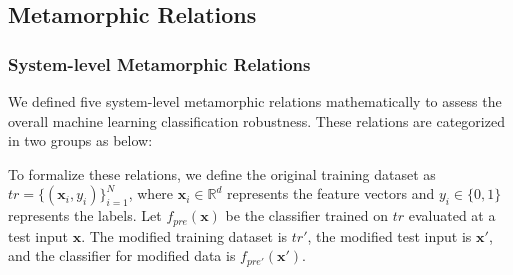 \documentclass[12pt,a4paper]{article}
\begin{document}
	\subsection{Metamorphic Relations}
	
	\subsubsection{System-level Metamorphic Relations}
	\label{sec:sys_mrs}
	
	We defined five system-level metamorphic relations mathematically to assess the overall machine learning classification robustness. These relations are categorized in two groups as below:

		To formalize these relations, we define the original training dataset as $tr = \{(\mathbf{x}_i, y_i)\}_{i=1}^N$, where $\mathbf{x}_i \in \mathbb{R}^d$ represents the feature vectors and $y_i \in \{0, 1\}$ represents the labels. Let $f_{pre}(\mathbf{x})$ be the classifier trained on $tr$ evaluated at a test input $\mathbf{x}$. The modified training dataset is $tr'$, the modified test input is $\mathbf{x}'$, and the classifier for modified data is $f_{pre'}(\mathbf{x}')$.
		
\end{document}
